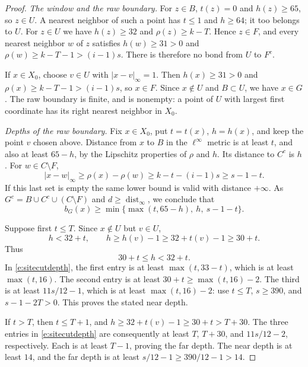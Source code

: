 \begin{proof}
\emph{The window and the raw boundary.}
For \(z\in B\), \(t(z)=0\) and \(h(z)\ge65\), so \(z\in U\).
A nearest neighbor of such a point has \(t\le1\) and
\(h\ge64\); it too belongs to \(U\).  For \(z\in U\) we
have \(h(z)\ge32\) and \(\rho(z)\ge k-T\).  Hence \(z\in F\),
and every nearest neighbor \(w\) of \(z\) satisfies
\(h(w)\ge31>0\) and \(\rho(w)\ge k-T-1>(i-1)s\).
There is therefore no bond from \(U\) to \(F^c\).

If \(x\in X_0\), choose \(v\in U\) with
\(|x-v|_\infty=1\).  Then
\(h(x)\ge31>0\) and \(\rho(x)\ge k-T-1>(i-1)s\),
so \(x\in F\).  Since \(x\notin U\) and \(B\subset U\),
we have \(x\in G\).  The raw boundary is finite, and is
nonempty: a point of \(U\) with largest first coordinate has
its right nearest neighbor in \(X_0\).

\emph{Depths of the raw boundary.}
Fix \(x\in X_0\), put \(t=t(x)\), \(h=h(x)\), and keep the
point \(v\) chosen above.  Distance from \(x\) to \(B\) in
the \(\ell^\infty\) metric is at least \(t\), and also at
least \(65-h\), by the Lipschitz properties of \(\rho\) and
\(h\).  Its distance to \(C^c\) is \(h\).  For
\(w\in C\setminus F\),
\[
 |x-w|_\infty\ge\rho(x)-\rho(w)
       \ge k-t-(i-1)s\ge s-1-t.
\]
If this last set is empty the same lower bound is valid with
distance \(+\infty\).  As \(G^c=B\cup C^c\cup(C\setminus F)\)
and \(d\ge\operatorname{dist}_\infty\), we conclude that
\begin{equation}\label{e:sitecutdepth}
 b_G(x)\ge
    \min\{\max(t,65-h),\ h,\ s-1-t\}.
\end{equation}

Suppose first \(t\le T\).  Since \(x\notin U\) but \(v\in U\),
\[
 h<32+t,\qquad
 h\ge h(v)-1\ge32+t(v)-1\ge30+t.
\]
Thus
\begin{equation}\label{e:rawdepthrange}
                30+t\le h<32+t.
\end{equation}
In \eqref{e:sitecutdepth}, the first entry is at least
\(\max(t,33-t)\), which is at least \(\max(t,16)\).
The second entry is at least \(30+t\ge\max(t,16)-2\).
The third is at least \(11s/12-1\), which is at least
\(\max(t,16)-2\): use \(t\le T\), \(s\ge390\), and
\(s-1-2T>0\).  This proves the stated near depth.

If \(t>T\), then \(t\le T+1\), and
\(h\ge32+t(v)-1\ge30+t>T+30\).
The three entries in \eqref{e:sitecutdepth} are consequently
at least \(T\), \(T+30\), and \(11s/12-2\), respectively.
Each is at least \(T-1\), proving the far depth.
The near depth is at least \(14\), and the far depth is
at least \(s/12-1\ge390/12-1>14\).


\end{proof}
